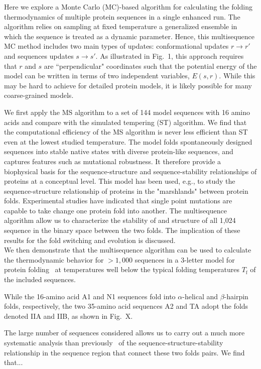 \documentclass[%
 aip,
rsi,%
 amsmath,amssymb,
 reprint,%
]{revtex4-1}
\newcommand	 {\sbar}	{{s}}
\newcommand	 {\rbar}	{{r}}
\begin{document}
Here we explore a Monte Carlo (MC)-based algorithm for calculating the folding thermodynamics of multiple protein sequences in a single enhanced run. The algorithm relies on sampling at fixed temperature a generalized ensemble in which the sequence is treated as a dynamic parameter. Hence, this multisequence MC method includes two main types of updates: conformational updates $\rbar\rightarrow\rbar'$ and sequences updates $\sbar\rightarrow\sbar'$. As illustrated in Fig.~1, this approach requires that $\rbar$ and $\sbar$ are ``perpendicular" coordinates such that the potential energy of the model can be written in terms of two independent variables, $E(\sbar,\rbar)$. While this may be hard to achieve for detailed protein models, it is likely possible for many coarse-grained models. 

We first apply the MS algorithm to a set of 144 model sequences with 16 amino acids and compare with the simulated tempering (ST) algorithm. We find that the computational efficiency of the MS algorithm is never less efficient than ST even at the lowest studied temperature. The model folds spontaneously designed sequences into stable native states with diverse protein-like sequences, and captures features such as mutational robustness. It therefore provide a biophysical basis for the sequence-structure and sequence-stability relationships of proteins at a conceptual level. This model has been used, e.g., to study the sequence-structure relationship of proteins in the "marshlands" between protein folds. Experimental studies have indicated that single point mutations are capable to take change one protein fold into another. The multisequence algorithm allow us to characterize the stability of and structure of all 1,024 sequence in the binary space between the two folds. The implication of these results for the fold switching and evolution is discussed. \\

We then demonstrate that the multisequence algorithm can be used to calculate the thermodynamic behavior for $>1,000$ sequences in a 3-letter model for protein folding~\cite{Bhattacherjee2012} at temperatures well below the typical folding temperatures $T_\mathrm{f}$ of the included sequences.  

While the 16-amino acid A1 and N1 sequences fold into $\alpha$-helical and $\beta$-hairpin folds, respectively, the two 35-amino acid sequences A2 and TA adopt the folds denoted IIA and IIB, as shown in Fig.~X. 

The large number of sequences considered allows us to carry out a much more systematic analysis than previously~\cite{Holzgrafe2014,Holzgrafe2015} of the sequence-structure-stability relationship in the sequence region that connect these two folds pairs. We find that...
\end{document}
